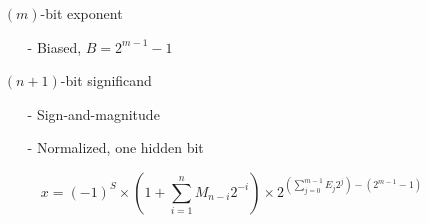 \documentclass[12pt,openany]{book}
\begin{document}
			      	\begin{itemize}
			      		\item[] $(m)$-bit exponent
			      		      \begin{itemize}
			      		      	\item[-] Biased, $B = 2^{m-1} - 1$
			      		      \end{itemize}
			      		\item[] $(n + 1)$-bit significand
			      		      \begin{itemize}
			      		      	\item[-] Sign-and-magnitude
			      		      	\item[-] Normalized, one hidden bit
			      		      \end{itemize}
			      		      
			      	\end{itemize}
			      	
			      	\[
			      		x = (-1)^S \times \left(1 + \sum_{i=1}^{n} M_{n-i}2^{-i} \right) \times 2^{\left(\sum_{j=0}^{m-1} E_j2^j\right) - (2^{m-1} - 1)}
			      	\]
\end{document}
